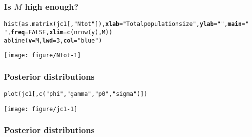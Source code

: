 \documentclass[color=usenames,dvipsnames]{beamer}\usepackage[]{graphicx}\usepackage[]{color}
\makeatletter
\newcommand{\hlnum}[1]{\textcolor[rgb]{0.69,0.494,0}{#1}}%
\newcommand{\hlstr}[1]{\textcolor[rgb]{0.749,0.012,0.012}{#1}}%
\newcommand{\hlstd}[1]{\textcolor[rgb]{0,0,0}{#1}}%
\newcommand{\hlkwc}[1]{\textcolor[rgb]{0,0,0}{\textbf{#1}}}%
\newcommand{\hlkwd}[1]{\textcolor[rgb]{0.004,0.004,0.506}{#1}}%
\newenvironment{kframe}{%
 \def\at@end@of@kframe{}%
 \ifinner\ifhmode%
  \def\at@end@of@kframe{\end{minipage}}%
  \begin{minipage}{\columnwidth}%
 \fi\fi%
 \def\FrameCommand##1{\hskip\@totalleftmargin \hskip-\fboxsep
 \colorbox{shadecolor}{##1}\hskip-\fboxsep
     \hskip-\linewidth \hskip-\@totalleftmargin \hskip\columnwidth}%
 \MakeFramed {\advance\hsize-\width
   \@totalleftmargin\z@ \linewidth\hsize
   \@setminipage}}%
 {\par\unskip\endMakeFramed%
 \at@end@of@kframe}
\newenvironment{knitrout}{}{} %
\makeatother
\begin{document}
\begin{frame}
  \frametitle{Is $M$ high enough?}
\begin{knitrout}\tiny
{}\color{fgcolor}\begin{kframe}
\begin{alltt}
\hlkwd{hist}\hlstd{(}\hlkwd{as.matrix}\hlstd{(jc1[,}\hlstr{"Ntot"}\hlstd{]),} \hlkwc{xlab}\hlstd{=}\hlstr{"Total population size"}\hlstd{,} \hlkwc{ylab}\hlstd{=}\hlstr{""}\hlstd{,} \hlkwc{main}\hlstd{=}\hlstr{""}\hlstd{,} \hlkwc{freq}\hlstd{=}\hlnum{FALSE}\hlstd{,} \hlkwc{xlim}\hlstd{=}\hlkwd{c}\hlstd{(}\hlkwd{nrow}\hlstd{(y), M))}
\hlkwd{abline}\hlstd{(}\hlkwc{v}\hlstd{=M,} \hlkwc{lwd}\hlstd{=}\hlnum{3}\hlstd{,} \hlkwc{col}\hlstd{=}\hlstr{"blue"}\hlstd{)}
\end{alltt}
\end{kframe}

{\centering \texttt{[image: figure/Ntot-1]} 

}



\end{knitrout}
\end{frame}






\begin{frame}[fragile]
  \frametitle{Posterior distributions}
\begin{knitrout}\scriptsize
{}\color{fgcolor}\begin{kframe}
\begin{alltt}
\hlkwd{plot}\hlstd{(jc1[,}\hlkwd{c}\hlstd{(}\hlstr{"phi"}\hlstd{,} \hlstr{"gamma"}\hlstd{,} \hlstr{"p0"}\hlstd{,} \hlstr{"sigma"}\hlstd{)])}
\end{alltt}
\end{kframe}

{\centering \texttt{[image: figure/jc1-1]} 

}



\end{knitrout}
\end{frame}






\begin{frame}[fragile]
  \frametitle{Posterior distributions}


\begin{center}
\end{center}
\end{frame}
\end{document}
